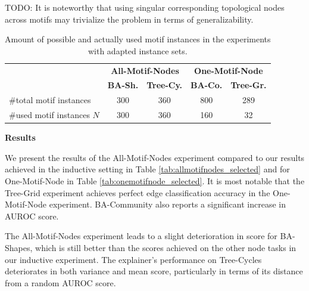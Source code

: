 TODO: It is noteworthy that using singular corresponding topological nodes across motifs may trivialize the problem in terms of generalizability. %


\begin{table}[h]
    \centering
    \scriptsize
    \begin{tabular}{l|cc|cc}
    \textbf{} & \multicolumn{2}{c|}{\textbf{All-Motif-Nodes}} & \multicolumn{2}{c}{\textbf{One-Motif-Node}} \\
    \addlinespace
    \toprule
    \textbf{} & \textbf{BA-Sh.} & \textbf{Tree-Cy.} & \textbf{BA-Co.} & \textbf{Tree-Gr.} \\
    \midrule
    \#total motif instances & 300 & 360 & 800 & 289 \\
    \#used motif instances $N$ & 300 & 360 & 160  & 32 \\
    \end{tabular}
    \caption[Statistics of adapted Motif Node Instance]{Amount of possible and actually used motif instances in the experiments with adapted instance sets.}
    \label{tab:motif-statistics-exp}
\end{table}

\textbf{Results}\par
We present the results of the All-Motif-Nodes experiment compared to our results achieved in the inductive setting in Table \ref{tab:allmotifnodes_selected} and for One-Motif-Node in Table \ref{tab:onemotifnode_selected}. It is most notable that the Tree-Grid experiment achieves perfect edge classification accuracy in the One-Motif-Node experiment. BA-Community also reports a significant increase in AUROC score.

The All-Motif-Nodes experiment leads to a slight deterioration in score for BA-Shapes, which is still better than the scores achieved on the other node tasks in our inductive experiment. The explainer's performance on Tree-Cycles deteriorates in both variance and mean score, particularly in terms of its distance from a random AUROC score.

